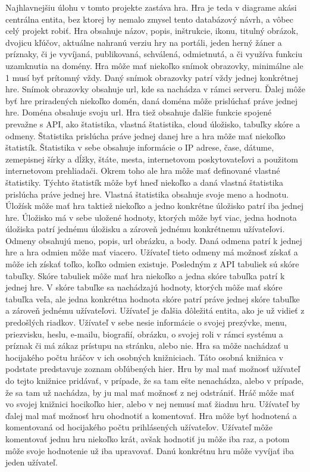 Najhlavnejšiu úlohu v tomto projekte zastáva hra. Hra je teda v diagrame akási centrálna entita, bez ktorej by nemalo zmysel tento databázový návrh, a vôbec celý projekt robiť. Hra obsahuje názov, popis, inštrukcie, ikonu, titulný obrázok, dvojicu kľúčov, aktuálne nahranú verziu hry na portáli, jeden herný žáner a príznaky, či je vyvíjaná, publikovaná, schválená, odmietnutá, a či využíva funkciu uzamknutia na domény. Hra môže mať niekoľko snímok obrazovky, minimálne ale 1 musí byť prítomný vždy. Daný snímok obrazovky patrí vždy jednej konkrétnej hre. Snímok obrazovky obsahuje url, kde sa nachádza v rámci serveru. Ďalej môže byť hre priradených niekoľko domén, daná doména môže prislúchať práve jednej hre. Doména obsahuje svoju url. Hra tiež obsahuje ďalšie funkcie spojené prevažne s API, ako štatistika, vlastná štatistika, cloud úložisko, tabuľky skóre a odmeny. Štatistika prislúcha práve jednej danej hre a hra môže mať niekoľko štatistík. Štatistika v sebe obsahuje informácie o IP adrese, čase, dátume, zemepisnej šírky a dĺžky, štáte, mesta, internetovom poskytovateľovi a použitom internetovom prehliadači. Okrem toho ale hra môže mať definované vlastné štatistiky. Týchto štatistík môže byť hneď niekoľko a daná vlastná štatistika prislúcha práve jednej hre. Vlastná štatistika obsahuje svoje meno a hodnotu. Úložísk môže mať hra taktiež niekoľko a jedno konkrétne úložisko patrí iba jednej hre. Úložisko má v sebe uložené hodnoty, ktorých môže byť viac, jedna hodnota úložiska patrí jednému úložisku a zároveň jednému konkrétnemu užívateľovi. Odmeny obsahujú meno, popis, url obrázku, a body. Daná odmena patrí k jednej hre a hra odmien môže mať viacero. Užívateľ tieto odmeny má možnosť získať a môže ich získať toľko, koľko odmien existuje. Posledným z API tabuliek sú skóre tabuľky. Skóre tabuliek môže mať hra niekoľko a jedna skóre tabuľka patrí k jednej hre. V skóre tabuľke sa nachádzajú hodnoty, ktorých môže mať skóre tabuľka veľa, ale jedna konkrétna hodnota skóre patrí práve jednej skóre tabuľke a zároveň jednému užívateľovi. Užívateľ je ďalšia dôležitá entita, ako je už vidieť z predošlých riadkov. Užívateľ v sebe nesie informácie o svojej prezývke, menu, priezvisku, heslu, e-mailu, biografií, obrázku, o svojej roli v rámci systému a príznak či má zákaz prístupu na stránku, alebo nie. Hra sa môže nachádzať u hocijakého počtu hráčov v ich osobných knižniciach. Táto osobná knižnica v podstate predstavuje zoznam obľúbených hier. Hru by mal mať možnosť užívateľ do tejto knižnice pridávať, v prípade, že sa tam ešte nenachádza, alebo v prípade, že sa tam už nachádza, by ju mal mať možnosť z nej odstrániť. Hráč môže mať vo svojej knižnici hocikoľko hier, alebo v nej nemusí mať žiadnu hru. Užívateľ by ďalej mal mať možnosť hru ohodnotiť a komentovať. Hra môže byť hodnotená a komentovaná od hocijakého počtu prihlásených užívateľov. Užívateľ môže komentovať jednu hru niekoľko krát, avšak hodnotiť ju môže iba raz, a potom môže svoje hodnotenie už iba upravovať. Danú konkrétnu hru môže vyvíjať iba jeden užívateľ.
